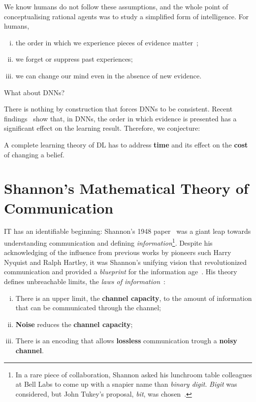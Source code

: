 We know humans do not follow these assumptions, and the whole point of conceptualising rational agents was to study a simplified form of intelligence. For humans,
\begin{enumerate}
	[i.]
	\item the order in which we experience pieces of evidence matter~\cite{wiesel:1982};
	\item we forget or suppress past experiences;
	\item we can change our mind even in the absence of new evidence.
\end{enumerate}
What about \aclp{DNN}?

There is nothing by construction that forces \acsp{DNN} to be consistent. Recent findings~\cite{achille:2018critical} show that, in \acsp{DNN}, the order in which evidence is presented has a significant effect on the learning result. Therefore, we conjecture:
\begin{conjecture}
	A complete learning theory of \acf{DL} has to address \textbf{time} and its effect on the \textbf{cost} of changing a belief.
\end{conjecture}


\section{Shannon's Mathematical Theory of Communication}

\acf{IT} has an identifiable beginning: Shannon's 1948 paper~ was a giant leap towards understanding communication and defining \emph{information}\footnote{In a rare piece of collaboration, Shannon asked his lunchroom table colleagues at Bell Labs to come up with a snapier name than \emph{binary digit}. \emph{Bigit} was considered, but John Tukey's proposal, \emph{bit}, was chosen~.}. Despite his acknowledging of the influence from previous works by pioneers such Harry Nyquist and Ralph Hartley, it was Shannon's unifying vision that revolutionized communication and provided a \emph{blueprint} for the information age~\cite{aftab:2001}. His theory defines unbreachable limits, the \emph{laws of information}~\cite{stone:2015}:

	\begin{enumerate}[i.]\label{shannon_laws}
		\item There is an upper limit, the \textbf{channel capacity}, to the amount of information that can be communicated through the channel;
		\item \textbf{Noise} reduces the \textbf{channel capacity};
		\item There is an encoding that allows \textbf{lossless} communication trough a \textbf{noisy channel}.
	\end{enumerate}

